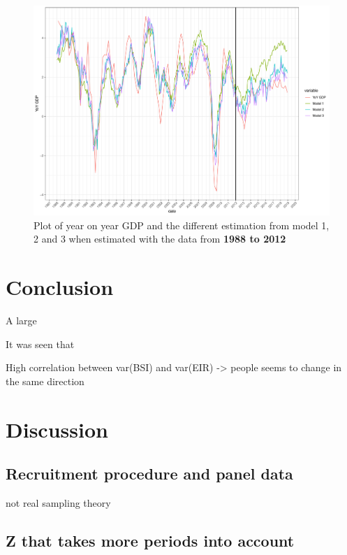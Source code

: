 \documentclass[12pt,a4paper,oneside]{book}
\begin{document}
\begin{figure}[H]
    \centering
    \includegraphics[scale=0.5]{Graphs/predictions3.pdf}
    \caption{Plot of year on year GDP and the different estimation from model 1, 2 and 3 when estimated with the data from \textbf{1988 to 2012}}
    \label{fig:predictions1}
\end{figure}













\chapter{Conclusion}

A large 

It was seen that


High correlation between var(BSI) and var(EIR) -> people seems to change in the same direction


\chapter{Discussion}

\section{Recruitment procedure and panel data}
not real sampling theory



\section{Z that takes more periods into account}
\end{document}
